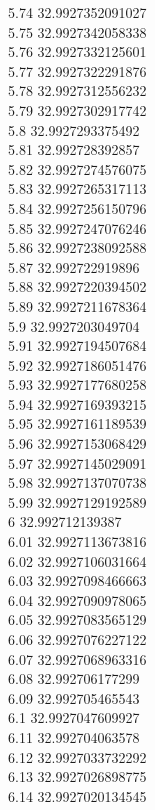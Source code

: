 {5.74	32.9927352091027\\
5.75	32.9927342058338\\
5.76	32.9927332125601\\
5.77	32.9927322291876\\
5.78	32.9927312556232\\
5.79	32.9927302917742\\
5.8	32.9927293375492\\
5.81	32.992728392857\\
5.82	32.9927274576075\\
5.83	32.9927265317113\\
5.84	32.9927256150796\\
5.85	32.9927247076246\\
5.86	32.9927238092588\\
5.87	32.992722919896\\
5.88	32.9927220394502\\
5.89	32.9927211678364\\
5.9	32.9927203049704\\
5.91	32.9927194507684\\
5.92	32.9927186051476\\
5.93	32.9927177680258\\
5.94	32.9927169393215\\
5.95	32.9927161189539\\
5.96	32.9927153068429\\
5.97	32.9927145029091\\
5.98	32.9927137070738\\
5.99	32.9927129192589\\
6	32.992712139387\\
6.01	32.9927113673816\\
6.02	32.9927106031664\\
6.03	32.9927098466663\\
6.04	32.9927090978065\\
6.05	32.9927083565129\\
6.06	32.9927076227122\\
6.07	32.9927068963316\\
6.08	32.992706177299\\
6.09	32.992705465543\\
6.1	32.9927047609927\\
6.11	32.992704063578\\
6.12	32.9927033732292\\
6.13	32.9927026898775\\
6.14	32.9927020134545\\
}
